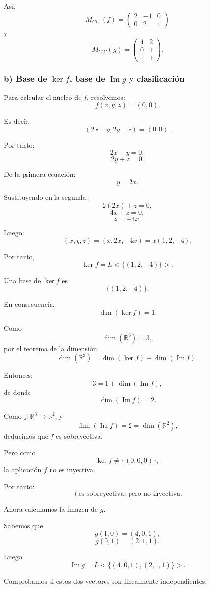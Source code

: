\documentclass[12pt]{article}
\begin{document}
Así,
\[
\boxed{
M_{CC'}(f)=
\begin{pmatrix}
2&-1&0\\
0&2&1
\end{pmatrix}
}
\]
y
\[
\boxed{
M_{C'C}(g)=
\begin{pmatrix}
4&2\\
0&1\\
1&1
\end{pmatrix}.
}
\]

\subsubsection*{b) Base de \(\ker f\), base de \(\operatorname{Im} g\) y clasificación}

Para calcular el núcleo de \(f\), resolvemos:
\[
f(x,y,z)=(0,0).
\]

Es decir,
\[
(2x-y,2y+z)=(0,0).
\]

Por tanto:
\[
2x-y=0,
\]
\[
2y+z=0.
\]

De la primera ecuación:
\[
y=2x.
\]

Sustituyendo en la segunda:
\[
2(2x)+z=0,
\]
\[
4x+z=0,
\]
\[
z=-4x.
\]

Luego:
\[
(x,y,z)=(x,2x,-4x)=x(1,2,-4).
\]

Por tanto,
\[
\ker f=L<\{(1,2,-4)\}>.
\]

Una base de \(\ker f\) es
\[
\boxed{\{(1,2,-4)\}.}
\]

En consecuencia,
\[
\dim(\ker f)=1.
\]

Como
\[
\dim(\mathbb{R}^3)=3,
\]
por el teorema de la dimensión:
\[
\dim(\mathbb{R}^3)=\dim(\ker f)+\dim(\operatorname{Im} f).
\]

Entonces:
\[
3=1+\dim(\operatorname{Im} f),
\]
de donde
\[
\dim(\operatorname{Im} f)=2.
\]

Como \(f:\mathbb{R}^3\longrightarrow \mathbb{R}^2\), y
\[
\dim(\operatorname{Im} f)=2=\dim(\mathbb{R}^2),
\]
deducimos que \(f\) es sobreyectiva.

Pero como
\[
\ker f\neq \{(0,0,0)\},
\]
la aplicación \(f\) no es inyectiva.

Por tanto:
\[
\boxed{f \text{ es sobreyectiva, pero no inyectiva.}}
\]

Ahora calculamos la imagen de \(g\).

Sabemos que
\[
g(1,0)=(4,0,1),
\]
\[
g(0,1)=(2,1,1).
\]

Luego
\[
\operatorname{Im} g=L<\{(4,0,1),(2,1,1)\}>.
\]

Comprobamos si estos dos vectores son linealmente independientes.
\end{document}
